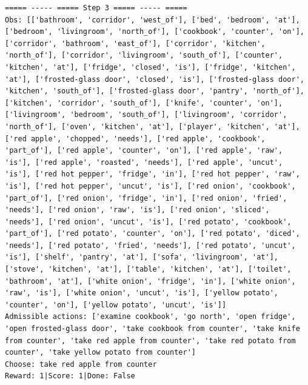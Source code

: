 \documentclass[11pt]{article}
\begin{document}
\begin{lstlisting}
===== ----- ===== Step 3 ===== ----- =====
Obs: [['bathroom', 'corridor', 'west_of'], ['bed', 'bedroom', 'at'], ['bedroom', 'livingroom', 'north_of'], ['cookbook', 'counter', 'on'], ['corridor', 'bathroom', 'east_of'], ['corridor', 'kitchen', 'north_of'], ['corridor', 'livingroom', 'south_of'], ['counter', 'kitchen', 'at'], ['fridge', 'closed', 'is'], ['fridge', 'kitchen', 'at'], ['frosted-glass door', 'closed', 'is'], ['frosted-glass door', 'kitchen', 'south_of'], ['frosted-glass door', 'pantry', 'north_of'], ['kitchen', 'corridor', 'south_of'], ['knife', 'counter', 'on'], ['livingroom', 'bedroom', 'south_of'], ['livingroom', 'corridor', 'north_of'], ['oven', 'kitchen', 'at'], ['player', 'kitchen', 'at'], ['red apple', 'chopped', 'needs'], ['red apple', 'cookbook', 'part_of'], ['red apple', 'counter', 'on'], ['red apple', 'raw', 'is'], ['red apple', 'roasted', 'needs'], ['red apple', 'uncut', 'is'], ['red hot pepper', 'fridge', 'in'], ['red hot pepper', 'raw', 'is'], ['red hot pepper', 'uncut', 'is'], ['red onion', 'cookbook', 'part_of'], ['red onion', 'fridge', 'in'], ['red onion', 'fried', 'needs'], ['red onion', 'raw', 'is'], ['red onion', 'sliced', 'needs'], ['red onion', 'uncut', 'is'], ['red potato', 'cookbook', 'part_of'], ['red potato', 'counter', 'on'], ['red potato', 'diced', 'needs'], ['red potato', 'fried', 'needs'], ['red potato', 'uncut', 'is'], ['shelf', 'pantry', 'at'], ['sofa', 'livingroom', 'at'], ['stove', 'kitchen', 'at'], ['table', 'kitchen', 'at'], ['toilet', 'bathroom', 'at'], ['white onion', 'fridge', 'in'], ['white onion', 'raw', 'is'], ['white onion', 'uncut', 'is'], ['yellow potato', 'counter', 'on'], ['yellow potato', 'uncut', 'is']]
Admissible actions: ['examine cookbook', 'go north', 'open fridge', 'open frosted-glass door', 'take cookbook from counter', 'take knife from counter', 'take red apple from counter', 'take red potato from counter', 'take yellow potato from counter']
Choose: take red apple from counter
Reward: 1|Score: 1|Done: False


\end{lstlisting}
\end{document}
